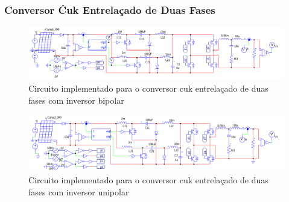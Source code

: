 \documentclass[
	12pt,				%
	openany,
	onseside,
	a4paper,			%
	english,			%
	french,				%
	spanish,			%
	brazil,				%
	]{abntex2}
\begin{document}
\subsubsection{Conversor Ćuk Entrelaçado de Duas Fases}
\begin{figure}[H]%
	\captionsetup{justification=centering}
	\centering
		\includegraphics[width= \linewidth]{comp_interv_circ_clean}
		\caption{Circuito implementado para o conversor cuk entrelaçado de duas fases com inversor bipolar}
		\label{fig:comp_interv_circ_clean}
\end{figure}
\begin{figure}[H]%
	\captionsetup{justification=centering}
	\centering
		\includegraphics[width= \linewidth]{comp_interv_circ_clean_unip}
		\caption{Circuito implementado para o conversor cuk entrelaçado de duas fases com inversor unipolar}
		\label{fig:comp_interv_circ_clean_unip}
\end{figure}
\end{document}
